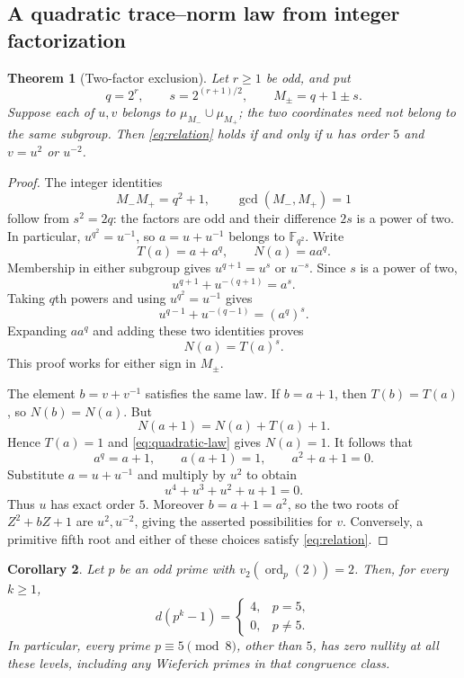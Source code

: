 \documentclass[a4paper]{article}
\newtheorem{theorem}{Theorem}[section]
\newtheorem{corollary}[theorem]{Corollary}
\newcommand{\F}{\mathbb F}
\newcommand{\ord}{\operatorname{ord}}
\begin{document}
\subsection{A quadratic trace--norm law from integer factorization}

\begin{theorem}[Two-factor exclusion]\label{thm:two-factors}
Let $r\geq1$ be odd, and put
\[
 q=2^r,\qquad s=2^{(r+1)/2},\qquad M_\pm=q+1\pm s.
\]
Suppose each of $u,v$ belongs to
$\mu_{M_-}\cup\mu_{M_+}$; the two coordinates need not belong to
the same subgroup.
Then \eqref{eq:relation} holds if and only if $u$ has order $5$
and $v=u^2$ or $u^{-2}$.
\end{theorem}

\begin{proof}
The integer identities
\begin{equation}\label{eq:aurifeuillian}
 M_-M_+=q^2+1,\qquad \gcd(M_-,M_+)=1
\end{equation}
follow from $s^2=2q$: the factors are odd and their difference $2s$
is a power of two.
In particular, $u^{q^2}=u^{-1}$, so $a=u+u^{-1}$ belongs to
$\F_{q^2}$.  Write
\[
 T(a)=a+a^q,\qquad N(a)=aa^q.
\]
Membership in either subgroup gives $u^{q+1}=u^s$ or $u^{-s}$.
Since $s$ is a power of two,
\[
 u^{q+1}+u^{-(q+1)}=a^s.
\]
Taking $q$th powers and using $u^{q^2}=u^{-1}$ gives
\[
 u^{q-1}+u^{-(q-1)}=(a^q)^s.
\]
Expanding $aa^q$ and adding these two identities proves
\begin{equation}\label{eq:quadratic-law}
 \boxed{\ N(a)=T(a)^s.\ }
\end{equation}
This proof works for either sign in $M_\pm$.

The element $b=v+v^{-1}$ satisfies the same law.  If $b=a+1$, then
$T(b)=T(a)$, so $N(b)=N(a)$.  But
\[
 N(a+1)=N(a)+T(a)+1.
\]
Hence $T(a)=1$ and \eqref{eq:quadratic-law} gives $N(a)=1$.
It follows that
\[
 a^q=a+1,\qquad a(a+1)=1,\qquad a^2+a+1=0.
\]
Substitute $a=u+u^{-1}$ and multiply by $u^2$ to obtain
\[
 u^4+u^3+u^2+u+1=0.
\]
Thus $u$ has exact order $5$.  Moreover $b=a+1=a^2$, so the
two roots of $Z^2+bZ+1$ are $u^2,u^{-2}$, giving the asserted
possibilities for $v$.
Conversely, a primitive fifth root and either of these choices satisfy
\eqref{eq:relation}.
\end{proof}

\begin{corollary}\label{cor:quadratic-primes}
Let $p$ be an odd prime with $v_2(\ord_p(2))=2$.
Then, for every $k\geq1$,
\[
 d(p^k-1)=
 \begin{cases}
  4,&p=5,\\
  0,&p\ne5.
 \end{cases}
\]
In particular, every prime $p\equiv5\pmod8$, other than $5$,
has zero nullity at all these levels, including any Wieferich primes
in that congruence class.
\end{corollary}
\end{document}
